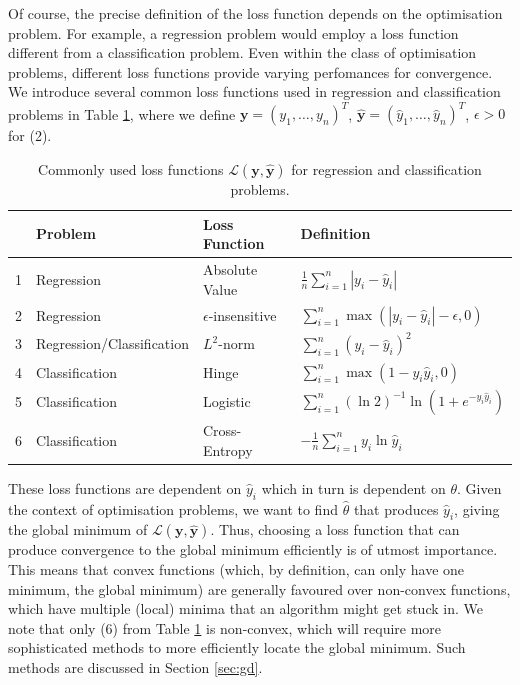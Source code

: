 \documentclass[a4paper,11pt,titlepage]{article}
\theoremstyle{definition}
\theoremstyle{plain}
\theoremstyle{remark}
\begin{document}
Of course, the precise definition of the loss function depends on the optimisation problem. For example, a regression problem would employ a loss function different from a classification problem. Even within the class of optimisation problems, different loss functions provide varying perfomances for convergence. We introduce several common loss functions used in regression and classification problems in Table \ref{tab:lfd}, where we define $\mathbf{y} = \left(y_1, \dots, y_n\right)^T$, $\mathbf{\hat{y}} = \left(\hat{y}_1, \dots, \hat{y}_n\right)^T$, $\epsilon > 0$ for (2).
\begin{table}[htbp]
    \centering
    \begin{tabular}{llll}
        \toprule
          & Problem  & Loss Function  &  Definition \\
        \midrule
        1 & Regression       & Absolute Value            & $\frac{1}{n}\sum_{i=1}^n |y_i - \hat{y}_i|$      \\
        2 &Regression       & $\epsilon$-insensitive   & $\sum_{i=1}^n \max{(|y_i - \hat{y}_i| - \epsilon, 0)}$\\
        3 & Regression/Classification       & $L^2$-norm                   & $\sum_{i=1}^n\left(y_i - \hat{y}_i\right)^2$        \\
        4 & Classification  & Hinge                     & $\sum_{i=1}^n\max{(1-y_i\hat{y}_i, 0)}$ \\
        5 & Classification  & Logistic                  & $\sum_{i=1}^n \left(\ln 2\right)^{-1}\ln(1 + e^{-y_i\hat{y}_i})$ \\
        6 & Classification  & Cross-Entropy             & $- \frac{1}{n} \sum_{i=1}^n y_i\ln \hat{y}_i$\\ 
        \bottomrule
    \end{tabular}
    \caption{Commonly used loss functions $\mathcal{L}(\mathbf{y}, \mathbf{\hat{y}})$ for regression and classification problems.}
    \label{tab:lfd}
\end{table}

These loss functions are dependent on $\hat{y}_i$ which in turn is dependent on $\theta$. Given the context of optimisation problems, we want to find $\hat{\theta}$ that produces $\hat{y}_i$, giving the global minimum of $\mathcal{L}(\mathbf{y}, \mathbf{\hat{y}})$. Thus, choosing a loss function that can produce convergence to the global minimum efficiently is of utmost importance. This means that convex functions (which, by definition, can only have one minimum, the global minimum) are generally favoured over non-convex functions, which have multiple (local) minima that an algorithm might get stuck in. We note that only (6) from Table \ref{tab:lfd} is non-convex, which will require more sophisticated methods to more efficiently locate the global minimum. Such methods are discussed in Section \ref{sec:gd}.
\end{document}
